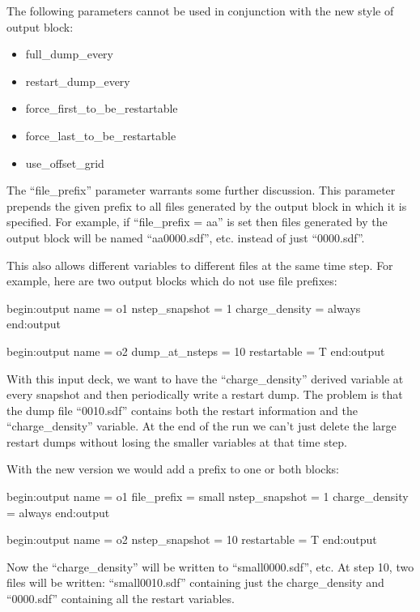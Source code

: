 The following parameters cannot be used in conjunction with the new style
of output block:

\begin{itemize}
\item full\_dump\_every
\item restart\_dump\_every
\item force\_first\_to\_be\_restartable
\item force\_last\_to\_be\_restartable
\item use\_offset\_grid
\end{itemize}

The ``file\_prefix'' parameter warrants some further discussion. This
parameter prepends the given prefix to all files generated by the output
block in which it is specified.  For example, if ``file\_prefix = aa'' is
set then files generated by the output block will be named ``aa0000.sdf'',
etc. instead of just ``0000.sdf''.

This also allows different variables to different files at the same
time step. For example, here are two output blocks which do not use file
prefixes:
\begin{boxverbatim}
begin:output
   name = o1
   nstep_snapshot = 1
   charge_density = always
end:output

begin:output
   name = o2
   dump_at_nsteps = 10
   restartable = T
end:output
\end{boxverbatim}

With this input deck, we want to have the ``charge\_density''
derived variable at every snapshot and then periodically write a
restart dump. The problem is that the dump file ``0010.sdf''
contains both the restart information and the ``charge\_density''
variable. At the end of the run we can't just delete the large
restart dumps without losing the smaller variables at that
time step.

With the new version we would add a prefix to one or both
blocks:
\begin{boxverbatim}
begin:output
   name = o1
   file_prefix = small
   nstep_snapshot = 1
   charge_density = always
end:output

begin:output
   name = o2
   nstep_snapshot = 10
   restartable = T
end:output
\end{boxverbatim}

Now the ``charge\_density'' will be written to ``small0000.sdf'', etc.
At step 10, two files will be written: ``small0010.sdf'' containing
just the charge\_density and ``0000.sdf'' containing all the restart
variables.

